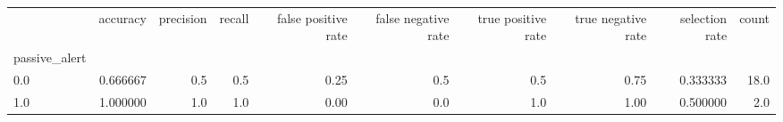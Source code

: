 \begin{tabular}{lrrrrrrrrr}
\toprule
{} &  accuracy &  precision &  recall &  false positive rate &  false negative rate &  true positive rate &  true negative rate &  selection rate &  count \\
passive\_alert &           &            &         &                      &                      &                     &                     &                 &        \\
\midrule
0.0           &  0.666667 &        0.5 &     0.5 &                 0.25 &                  0.5 &                 0.5 &                0.75 &        0.333333 &   18.0 \\
1.0           &  1.000000 &        1.0 &     1.0 &                 0.00 &                  0.0 &                 1.0 &                1.00 &        0.500000 &    2.0 \\
\bottomrule
\end{tabular}
